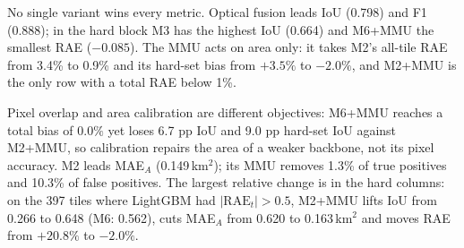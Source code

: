 \begin{table}[!ht]
\centering
\caption{Ablation on all and hard held-out tiles}
\label{tab:q2_ablation}
\end{table}

No single variant wins every metric. Optical fusion leads IoU (0.798) and F1 (0.888); in the hard block M3 has the highest IoU (0.664) and M6+MMU the smallest RAE ($-0.085$). The MMU acts on area only: it takes M2's all-tile RAE from 3.4\% to 0.9\% and its hard-set bias from $+3.5\%$ to $-2.0\%$, and M2+MMU is the only row with a total RAE below 1\%.

Pixel overlap and area calibration are different objectives: M6+MMU reaches a total bias of $0.0\%$ yet loses 6.7 pp IoU and 9.0 pp hard-set IoU against M2+MMU, so calibration repairs the area of a weaker backbone, not its pixel accuracy. M2 leads MAE$_A$ (0.149\,km$^2$); its MMU removes 1.3\% of true positives and 10.3\% of false positives. The largest relative change is in the hard columns: on the 397 tiles where LightGBM had $|\mathrm{RAE}_t|>0.5$, M2+MMU lifts IoU from 0.266 to 0.648 (M6: 0.562), cuts MAE$_A$ from 0.620 to 0.163\,km$^2$ and moves RAE from $+20.8\%$ to $-2.0\%$.

